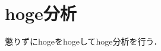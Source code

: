 \documentclass[a4paper,xelatex,ja=standard,hiresbb,12pt]{bxjsarticle}
\begin{document}
    \section{hoge分析 \label{sec:手法2}}
    懲りずにhogeをhogeしてhoge分析を行う．
    

\end{document}
